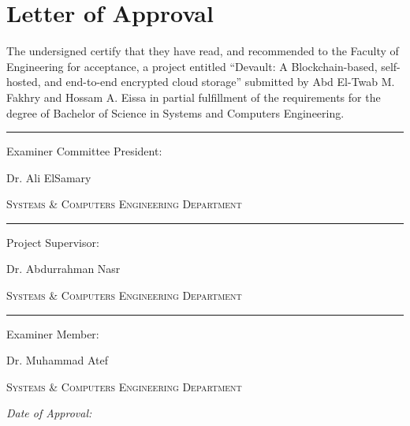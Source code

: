 
\chapter*{Letter of Approval}

The undersigned certify that they have read, and recommended to the Faculty of Engineering for acceptance, a project entitled ``Devault: A Blockchain-based, self-hosted, and end-to-end encrypted cloud storage'' submitted by Abd El-Twab M. Fakhry and Hossam A. Eissa in partial fulfillment of the requirements for the degree of Bachelor of Science in Systems and Computers Engineering.\vspace{2cm}


\begin{center}
  \par\noindent\rule{0.50\textwidth}{0.4pt}\par
  \footnotesize
  Examiner Committee President:\par\vspace{4pt}
  \normalsize
  Dr. Ali ElSamary\par\vspace{4pt}
  \footnotesize
  \scshape
  Systems \& Computers Engineering Department\par
\end{center}\vspace{16pt}
\begin{multicols}{2}
  \begin{center}
    \par\noindent\rule{0.40\textwidth}{0.4pt}\par
    \footnotesize
    Project Supervisor:\par\vspace{4pt}
    \normalsize
    Dr. Abdurrahman Nasr\par\vspace{4pt}
    \footnotesize
    \scshape
    Systems \& Computers Engineering Department\par
  \end{center}
  \begin{center}
    \par\noindent\rule{0.40\textwidth}{0.4pt}\par
    \footnotesize
    Examiner Member:\par\vspace{4pt}
    \normalsize
    Dr. Muhammad Atef\par\vspace{4pt}
    \footnotesize
    \scshape
    Systems \& Computers Engineering Department\par
  \end{center}
\end{multicols}\vspace{2cm}
{
  \Large
  \textsl{Date of Approval:}
}